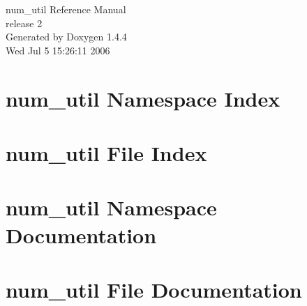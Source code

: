 \documentclass[a4paper]{book}
\begin{document}
\begin{titlepage}
\vspace*{7cm}
\begin{center}
{\Large num\_\-util Reference Manual\\[1ex]\large release 2 }\\
\vspace*{1cm}
{\large Generated by Doxygen 1.4.4}\\
\vspace*{0.5cm}
{\small Wed Jul 5 15:26:11 2006}\\
\end{center}
\end{titlepage}
\clearemptydoublepage
{}
\tableofcontents
\clearemptydoublepage
{}
\chapter{num\_\-util Namespace Index}

\chapter{num\_\-util File Index}

\chapter{num\_\-util Namespace Documentation}


\chapter{num\_\-util File Documentation}


\printindex
\end{document}

